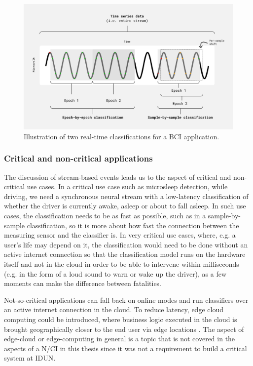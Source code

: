\begin{figure}[!ht]
  \centering
  \includegraphics[width=\linewidth]{per-sample.png}
  \caption{Illustration of two real-time classifications for a BCI application.}
  \label{fig:per-sample}
\end{figure}

\subsubsection{Critical and non-critical applications}
\label{chapter5-critical-and-non-critical-applications}

The discussion of stream-based events leads us to the aspect of critical and non-critical use cases. In a critical use case such as microsleep detection, while driving, we need a synchronous neural stream with a low-latency classification of whether the driver is currently awake, asleep or about to fall asleep. In such use cases, the classification needs to be as fast as possible, such as in a sample-by-sample classification, so it is more about how fast the connection between the measuring sensor and the classifier is. In very critical use cases, where, e.g. a user's life may depend on it, the classification would need to be done without an active internet connection so that the classification model runs on the hardware itself and not in the cloud in order to be able to intervene within milliseconds (e.g. in the form of a loud sound to warn or wake up the driver), as a few moments can make the difference between fatalities.

Not-so-critical applications can fall back on online modes and run classifiers over an active internet connection in the cloud. To reduce latency, edge cloud computing could be introduced, where business logic executed in the cloud is brought geographically closer to the end user via edge locations \citep{nomios_what_nodate}. The aspect of edge-cloud or edge-computing in general is a topic that is not covered in the aspects of a N/CI in this thesis since it was not a requirement to build a critical system at IDUN.

